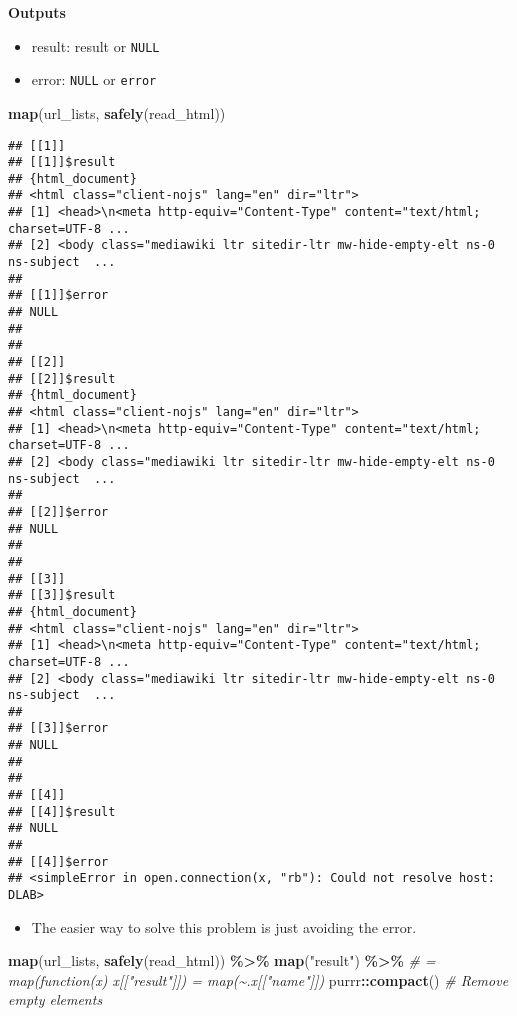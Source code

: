 \documentclass[
]{book}
\newenvironment{Shaded}{\begin{snugshade}}{\end{snugshade}}
\newcommand{\CommentTok}[1]{\textcolor[rgb]{0.56,0.35,0.01}{\textit{#1}}}
\newcommand{\KeywordTok}[1]{\textcolor[rgb]{0.13,0.29,0.53}{\textbf{#1}}}
\newcommand{\NormalTok}[1]{#1}
\newcommand{\OperatorTok}[1]{\textcolor[rgb]{0.81,0.36,0.00}{\textbf{#1}}}
\newcommand{\StringTok}[1]{\textcolor[rgb]{0.31,0.60,0.02}{#1}}
\providecommand{\tightlist}{%
  \setlength{\itemsep}{0pt}\setlength{\parskip}{0pt}}
\begin{document}
\textbf{Outputs}

\begin{itemize}
\tightlist
\item
  result: result or \texttt{NULL}
\item
  error: \texttt{NULL} or \texttt{error}
\end{itemize}

\begin{Shaded}
\begin{Highlighting}[]
\KeywordTok{map}\NormalTok{(url\_lists, }\KeywordTok{safely}\NormalTok{(read\_html))}
\end{Highlighting}
\end{Shaded}

\begin{verbatim}
## [[1]]
## [[1]]$result
## {html_document}
## <html class="client-nojs" lang="en" dir="ltr">
## [1] <head>\n<meta http-equiv="Content-Type" content="text/html; charset=UTF-8 ...
## [2] <body class="mediawiki ltr sitedir-ltr mw-hide-empty-elt ns-0 ns-subject  ...
## 
## [[1]]$error
## NULL
## 
## 
## [[2]]
## [[2]]$result
## {html_document}
## <html class="client-nojs" lang="en" dir="ltr">
## [1] <head>\n<meta http-equiv="Content-Type" content="text/html; charset=UTF-8 ...
## [2] <body class="mediawiki ltr sitedir-ltr mw-hide-empty-elt ns-0 ns-subject  ...
## 
## [[2]]$error
## NULL
## 
## 
## [[3]]
## [[3]]$result
## {html_document}
## <html class="client-nojs" lang="en" dir="ltr">
## [1] <head>\n<meta http-equiv="Content-Type" content="text/html; charset=UTF-8 ...
## [2] <body class="mediawiki ltr sitedir-ltr mw-hide-empty-elt ns-0 ns-subject  ...
## 
## [[3]]$error
## NULL
## 
## 
## [[4]]
## [[4]]$result
## NULL
## 
## [[4]]$error
## <simpleError in open.connection(x, "rb"): Could not resolve host: DLAB>
\end{verbatim}

\begin{itemize}
\tightlist
\item
  The easier way to solve this problem is just avoiding the error.
\end{itemize}

\begin{Shaded}
\begin{Highlighting}[]
\KeywordTok{map}\NormalTok{(url\_lists, }\KeywordTok{safely}\NormalTok{(read\_html)) }\OperatorTok{\%\textgreater{}\%}
\StringTok{  }\KeywordTok{map}\NormalTok{(}\StringTok{"result"}\NormalTok{) }\OperatorTok{\%\textgreater{}\%}\StringTok{ }
\StringTok{  }\CommentTok{\# = map(function(x) x[["result"]]) = map(\textasciitilde{}.x[["name"]])}
\StringTok{  }\NormalTok{purrr}\OperatorTok{::}\KeywordTok{compact}\NormalTok{() }\CommentTok{\# Remove empty elements}
\end{Highlighting}
\end{Shaded}
\end{document}
